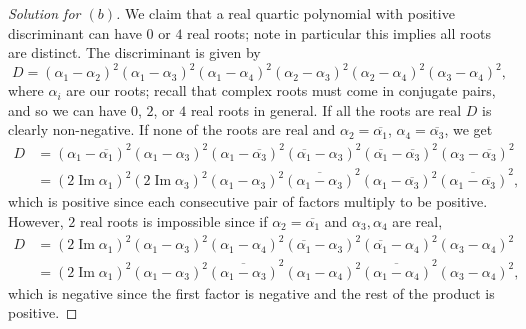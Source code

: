 \documentclass[12pt]{article}
\theoremstyle{remark}
\begin{document}
\begin{proof}[Solution for $(b)$]
  We claim that a real quartic polynomial with positive discriminant can have $0$ or $4$ real roots; note in particular this implies all roots are distinct. The discriminant is given by
  \begin{equation*}
    D = (\alpha_1 - \alpha_2)^2 (\alpha_1 - \alpha_3)^2 (\alpha_1 - \alpha_4)^2 (\alpha_2 - \alpha_3)^2 (\alpha_2 - \alpha_4)^2 (\alpha_3 - \alpha_4)^2,
  \end{equation*}
  where $\alpha_i$ are our roots; recall that complex roots must come in conjugate pairs, and so we can have $0$, $2$, or $4$ real roots in general. If all the roots are real $D$ is clearly non-negative. If none of the roots are real and $\alpha_2 = \overline{\alpha_1}$, $\alpha_4 = \overline{\alpha_3}$, we get
  \begin{align*}
    D &= (\alpha_1 - \overline{\alpha_1})^2(\alpha_1 - \alpha_3)^2(\alpha_1 - \overline{\alpha_3})^2(\overline{\alpha_1} - \alpha_3)^2 (\overline{\alpha_1} - \overline{\alpha_3})^2 (\alpha_3 - \overline{\alpha_3})^2\\
    &= (2\operatorname{Im}\alpha_1)^2(2\operatorname{Im}\alpha_3)^2(\alpha_1 - \alpha_3)^2\overline{(\alpha_1 - \alpha_3)}^2(\alpha_1 - \overline{\alpha_3})^2\overline{(\alpha_1 - \overline{\alpha_3})}^2,
  \end{align*}
  which is positive since each consecutive pair of factors multiply to be positive. However, $2$ real roots is impossible since if $\alpha_2 = \overline{\alpha_1}$ and $\alpha_3,\alpha_4$ are real,
  \begin{align*}
    D &= (2 \operatorname{Im}\alpha_1)^2 (\alpha_1 - \alpha_3)^2 (\alpha_1 - \alpha_4)^2 (\overline{\alpha_1} - \alpha_3)^2 (\overline{\alpha_1} - \alpha_4)^2 (\alpha_3 - \alpha_4)^2\\
    &= (2 \operatorname{Im}\alpha_1)^2(\alpha_1 - \alpha_3)^2\overline{(\alpha_1 - \alpha_3)}^2(\alpha_1 - \alpha_4)^2\overline{(\alpha_1 - \alpha_4)}^2(\alpha_3 - \alpha_4)^2,
  \end{align*}
  which is negative since the first factor is negative and the rest of the product is positive.
\end{proof}
\end{document}
